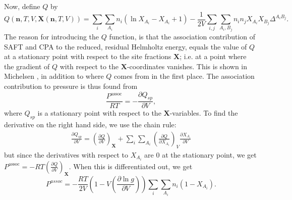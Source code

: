 \documentclass[10pt, a4paper]{article}
\newcommand{\mbf}[0]{\mathbf}
\newcommand*{\pder}[2]{\left(\frac{\partial #1}{\partial #2}\right)}
\newcommand{\lp}{\left(}
\newcommand{\rp}{\right)}
\begin{document}
Now, define $Q$ by 
\begin{equation}
  Q(\mbf n,T,V,\mathbf{X}(\mbf n, T, V)) = \sum_i \sum_{A_i} n_i \lp \ln X_{A_i} - X_{A_i} + 1\rp - \frac{1}{2V} \sum_{i,j} \sum_{A_i, B_j} n_i n_j X_{A_i} X_{B_j} \Delta^{A_i B_j}.
\end{equation}
The reason for introducing the $Q$ function, is that the association contribution of SAFT and CPA to the reduced, residual Helmholtz energy, equals the value of $Q$ at a stationary point with respect to the site fractions $\mbf X$; i.e. at a point where the gradient of $Q$ with respect to the $\mbf X$-coordinates vanishes. This is shown in Michelsen \cite{Michelsen01}, in addition to where $Q$ comes from in the first place. The association contribution to pressure is thus found from
$$
\frac{P^{\text{assoc}}}{RT} = - \frac{\partial Q_{sp}}{\partial V},
$$
where $Q_{sp}$ is a stationary point with respect to the $\mbf X$-variables. To find the derivative on the right hand side, we use the chain rule:
\begin{align*}
  \frac{\partial Q_{sp}}{\partial V} = \pder{Q}{V}_{\mbf X} + \sum_i \sum_{A_i} \pder{Q}{X_{A_i}}_V \frac{\partial X_{A_i}}{\partial V}
\end{align*}
but since the derivatives with respect to $X_{A_i}$ are $0$ at the stationary point, we get $P^{\text{assoc}} = -RT \pder{Q}{V}_{\mbf X}$. When this is differentiated out, we get
\begin{equation}
  P^{assoc} = -\frac{RT}{2V} \lp 1 - V \pder{\ln g}{V} \rp \sum_i \sum_{A_i} n_i (1-X_{A_i}).
\end{equation}
\end{document}
